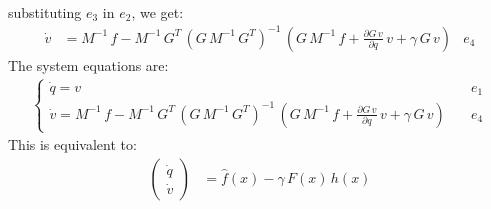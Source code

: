 \begin{enumerate}
\begin{align*}
	\end{align*}
	substituting $e_3$ in $e_2$, we get:
	\begin{align*}
		\dot v &= M^{-1}\,f - M^{-1}\,G^T\,\left(G\,M^{-1}\,G^T\right)^{-1}\,\left(G\,M^{-1}\,f + \frac{\partial G\,v}{\partial q}\,v + \gamma\,G\,v\right)& e_4
	\end{align*}
	The system equations are:
	\begin{align*}
		\begin{cases}
			\dot q = v \quad & e_1 \\
			\dot v = M^{-1}\,f - M^{-1}\,G^T\,\left(G\,M^{-1}\,G^T\right)^{-1}\,\left(G\,M^{-1}\,f + \frac{\partial G\,v}{\partial q}\,v + \gamma\,G\,v\right) \quad &  e_4 	
		\end{cases}
	\end{align*}
	This is equivalent to:
	\begin{align*}
		\begin{pmatrix}
			\dot q \\
			\dot v 
		\end{pmatrix} &= \hat f(x) - \gamma\,F(x)\,h(x)
	\end{align*}
\end{enumerate}